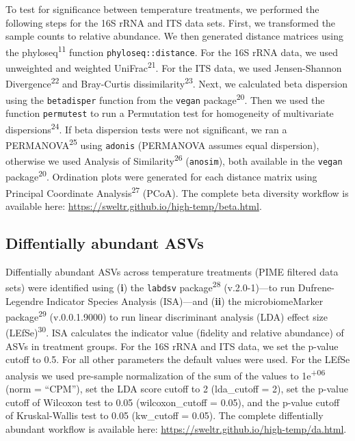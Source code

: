 \documentclass[
  10pt,
  letterpaper,
  DIV=11,
  numbers=noendperiod]{scrartcl}
\begin{document}
To test for significance between temperature treatments, we performed
the following steps for the 16S rRNA and ITS data sets. First, we
transformed the sample counts to relative abundance. We then generated
distance matrices using the phyloseq\textsuperscript{11} function
\texttt{phyloseq::distance}. For the 16S rRNA data, we used unweighted
and weighted UniFrac\textsuperscript{21}. For the ITS data, we used
Jensen-Shannon Divergence\textsuperscript{22} and Bray-Curtis
dissimilarity\textsuperscript{23}. Next, we calculated beta dispersion
using the \texttt{betadisper} function from the \texttt{vegan}
package\textsuperscript{20}. Then we used the function
\texttt{permutest} to run a Permutation test for homogeneity of
multivariate dispersions\textsuperscript{24}. If beta dispersion tests
were not significant, we ran a PERMANOVA\textsuperscript{25} using
\texttt{adonis} (PERMANOVA assumes equal dispersion), otherwise we used
Analysis of Similarity\textsuperscript{26} (\texttt{anosim}), both
available in the \texttt{vegan} package\textsuperscript{20}. Ordination
plots were generated for each distance matrix using Principal Coordinate
Analysis\textsuperscript{27} (PCoA). The complete beta diversity
workflow is available here:
\url{https://sweltr.github.io/high-temp/beta.html}.

\hypertarget{diffentially-abundant-asvs}{%
\subsection{Diffentially abundant
ASVs}\label{diffentially-abundant-asvs}}

Diffentially abundant ASVs across temperature treatments (PIME filtered
data sets) were identified using (\textbf{i}) the \texttt{labdsv}
package\textsuperscript{28} (v.2.0-1)---to run Dufrene-Legendre
Indicator Species Analysis (ISA)---and (\textbf{ii}) the
microbiomeMarker package\textsuperscript{29} (v.0.0.1.9000) to run
linear discriminant analysis (LDA) effect size
(LEfSe)\textsuperscript{30}. ISA calculates the indicator value
(fidelity and relative abundance) of ASVs in treatment groups. For the
16S rRNA and ITS data, we set the p-value cutoff to 0.5. For all other
parameters the default values were used. For the LEfSe analysis we used
pre-sample normalization of the sum of the values to
1e\textsuperscript{+06} (norm = ``CPM''), set the LDA score cutoff to 2
(lda\_cutoff = 2), set the p-value cutoff of Wilcoxon test to 0.05
(wilcoxon\_cutoff = 0.05), and the p-value cutoff of Kruskal-Wallis test
to 0.05 (kw\_cutoff = 0.05). The complete diffentially abundant workflow
is available here: \url{https://sweltr.github.io/high-temp/da.html}.
\end{document}
